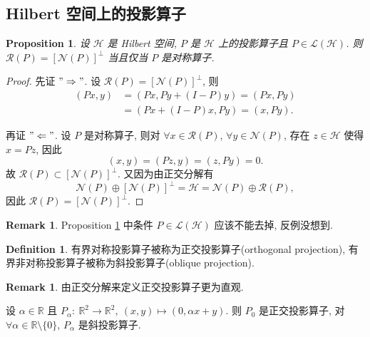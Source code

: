 \documentclass[a4paper,11pt]{article}
\newtheorem{proposition}[theorem]{Proposition}
\theoremstyle{definition}
\newtheorem{remark}[theorem]{Remark}
\newtheorem{definition}[theorem]{Definition}
\begin{document}
\begin{CJK*}{UTF8}{gbsn}
\section{Hilbert 空间上的投影算子}

\begin{proposition} \label{5}
    设 $ \mathcal{H} $ 是 Hilbert 空间, $ P $ 是 $ \mathcal{H} $ 上的投影算子且 $ P \in \mathscr{L}(\mathcal{H}) $. 
    则 $ \mathcal{R}(P) = [\mathcal{N}(P)]^\bot $ 当且仅当 $ P $ 是对称算子.
\end{proposition}

\begin{proof}
    先证 $ "\Rightarrow" $. 设 $ \mathcal{R}(P) = [\mathcal{N}(P)]^\bot $, 则
    \begin{align*}
        (P x, y) &= (Px, Py + (I - P)y) 
                 = (Px, Py)  \\
                 &= (Px + (I - P)x, Py)
                 = (x, Py).
    \end{align*}
    
    再证 $ "\Leftarrow" $. 设 $ P $ 是对称算子, 则对 $ \forall x \in \mathcal{R}(P) $, $ \forall y \in \mathcal{N}(P) $,
    存在 $ z \in \mathcal{H} $ 使得 $ x = Pz $, 因此
    $$
        (x, y) = (Pz, y) = (z, Py) = 0.
    $$
    故 $ \mathcal{R}(P) \subset [\mathcal{N}(P)]^\bot $.
    又因为由正交分解有
    $$
        \mathcal{N}(P) \oplus [\mathcal{N}(P)]^\bot = \mathcal{H} = \mathcal{N}(P) \oplus \mathcal{R}(P),
    $$
    因此 $ \mathcal{R}(P) = [\mathcal{N}(P)]^\bot $.
\end{proof}

\begin{remark}
    Proposition \ref{5} 中条件 $ P \in \mathscr{L}(\mathcal{H}) $ 应该不能去掉, 反例没想到.
\end{remark}

\begin{definition}
    有界对称投影算子被称为正交投影算子(orthogonal projection),
    有界非对称投影算子被称为斜投影算子(oblique projection).
\end{definition}

\begin{remark}
    由正交分解来定义正交投影算子更为直观.

    设 $ \alpha \in \mathbb{R} $ 且 $ P_\alpha :\ \mathbb{R}^2 \to \mathbb{R}^2,\ (x, y) \mapsto (0, \alpha x + y) $.
    则 $ P_0 $ 是正交投影算子, 对 $ \forall \alpha \in \mathbb{R} \setminus \{0\} $, $ P_\alpha $ 是斜投影算子.
\end{remark}

\end{CJK*}
\end{document}
